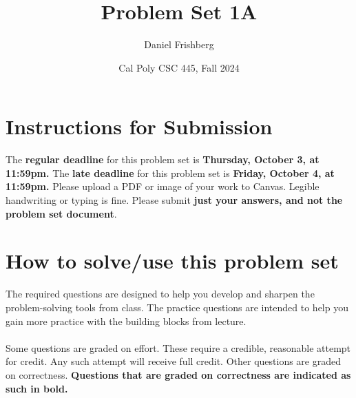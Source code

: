 \documentclass{article}
\title{Problem Set 1A}
\author{Daniel Frishberg}
\date{Cal Poly CSC 445, Fall 2024}
\theoremstyle{definition}
\begin{document}
\lstset{upquote=true}
\setlength\parindent{0em}

\maketitle
\section{Instructions for Submission}
The \textbf{regular deadline} for this problem set is \textbf{Thursday, October 3, at 11:59pm.} The \textbf{late deadline} for this problem set is \textbf{Friday, October 4, at 11:59pm.} Please upload a PDF or image of your work to Canvas. Legible handwriting or typing is fine. Please submit \textbf{just your answers, and not the problem set document}.

\section{How to solve/use this problem set}
The required questions are designed to help you develop and sharpen the problem-solving tools from class. The practice questions are intended to help you gain more practice with the building blocks from lecture. 
\\\\
Some questions are graded on effort. These require a credible, reasonable attempt for credit. Any such attempt will receive full credit. Other questions are graded on correctness.
\textbf{Questions that are graded on correctness are indicated as such in bold.}
\end{document}
